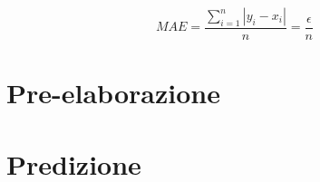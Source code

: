 \documentclass[%
    corpo=12pt,
    twoside,
    oldstyle,
    autoretitolo,
    greek,
    evenboxes,
]{toptesi}
\begin{document}
\begin{center}
  \begin{equation}
    MAE = \frac{\sum_{i=1}^{n}{|y_{i} - x_{i}|}}{n} = \frac{\epsilon}{n}
  \end{equation}
\end{center}


\chapter{Pre-elaborazione}
\label{chap:preprocessing}



\chapter{Predizione}
\label{chap:forecasting}

\end{document}

